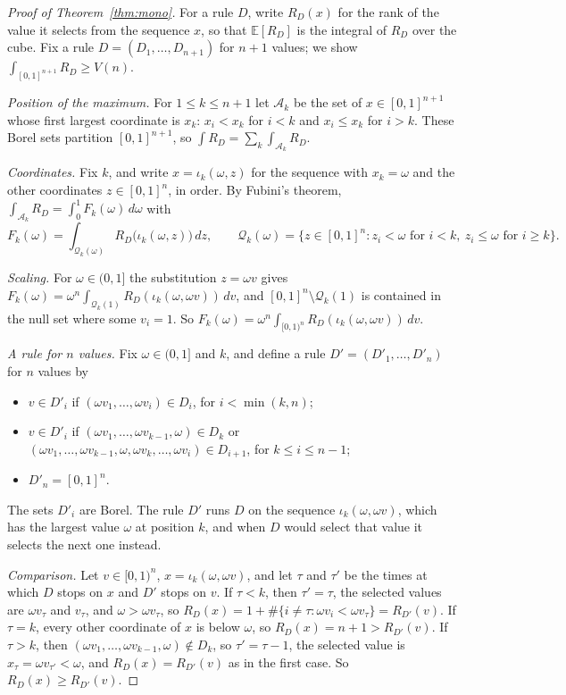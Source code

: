 \documentclass[11pt]{amsart}
\theoremstyle{definition}
\numberwithin{equation}{section}
\newcommand{\E}{\mathbb{E}}
\begin{document}
\begin{proof}[Proof of Theorem~\ref{thm:mono}]
For a rule $D$, write $R_D(x)$ for the rank of the value it selects from the sequence $x$, so that $\E[R_D]$ is the integral of $R_D$ over the cube. Fix a rule $D=(D_1,\dots,D_{n+1})$ for $n+1$ values; we show $\int_{[0,1]^{n+1}}R_D\ge V(n)$.

\emph{Position of the maximum.} For $1\le k\le n+1$ let $\mathcal A_k$ be the set of $x\in[0,1]^{n+1}$ whose first largest coordinate is $x_k$: $x_i<x_k$ for $i<k$ and $x_i\le x_k$ for $i>k$. These Borel sets partition $[0,1]^{n+1}$, so $\int R_D=\sum_k\int_{\mathcal A_k}R_D$.

\emph{Coordinates.} Fix $k$, and write $x=\iota_k(\omega,z)$ for the sequence with $x_k=\omega$ and the other coordinates $z\in[0,1]^n$, in order. By Fubini's theorem, $\int_{\mathcal A_k}R_D=\int_0^1F_k(\omega)\,d\omega$ with
\[
F_k(\omega)=\int_{\mathcal Q_k(\omega)}R_D\bigl(\iota_k(\omega,z)\bigr)\,dz,\qquad \mathcal Q_k(\omega)=\{z\in[0,1]^n: z_i<\omega\text{ for }i<k,\ z_i\le \omega\text{ for }i\ge k\}.
\]

\emph{Scaling.} For $\omega\in(0,1]$ the substitution $z=\omega v$ gives $F_k(\omega)=\omega^n\int_{\mathcal Q_k(1)}R_D(\iota_k(\omega,\omega v))\,dv$, and $[0,1]^n\setminus \mathcal Q_k(1)$ is contained in the null set where some $v_i=1$. So $F_k(\omega)=\omega^n\int_{[0,1)^n}R_D(\iota_k(\omega,\omega v))\,dv$.

\emph{A rule for $n$ values.} Fix $\omega\in(0,1]$ and $k$, and define a rule $D'=(D'_1,\dots,D'_n)$ for $n$ values by
\begin{itemize}
\item $v\in D'_i$ if $(\omega v_1,\dots,\omega v_i)\in D_i$, for $i<\min(k,n)$;
\item $v\in D'_i$ if $(\omega v_1,\dots,\omega v_{k-1},\omega)\in D_k$ or $(\omega v_1,\dots,\omega v_{k-1},\omega,\omega v_k,\dots,\omega v_i)\in D_{i+1}$, for $k\le i\le n-1$;
\item $D'_n=[0,1]^n$.
\end{itemize}
The sets $D'_i$ are Borel. The rule $D'$ runs $D$ on the sequence $\iota_k(\omega,\omega v)$, which has the largest value $\omega$ at position $k$, and when $D$ would select that value it selects the next one instead.

\emph{Comparison.} Let $v\in[0,1)^n$, $x=\iota_k(\omega,\omega v)$, and let $\tau$ and $\tau'$ be the times at which $D$ stops on $x$ and $D'$ stops on $v$. If $\tau<k$, then $\tau'=\tau$, the selected values are $\omega v_\tau$ and $v_\tau$, and $\omega>\omega v_\tau$, so $R_D(x)=1+\#\{i\ne\tau:\omega v_i<\omega v_\tau\}=R_{D'}(v)$. If $\tau=k$, every other coordinate of $x$ is below $\omega$, so $R_D(x)=n+1>R_{D'}(v)$. If $\tau>k$, then $(\omega v_1,\dots,\omega v_{k-1},\omega)\notin D_k$, so $\tau'=\tau-1$, the selected value is $x_\tau=\omega v_{\tau'}<\omega$, and $R_D(x)=R_{D'}(v)$ as in the first case. So $R_D(x)\ge R_{D'}(v)$.


\end{proof}
\end{document}
